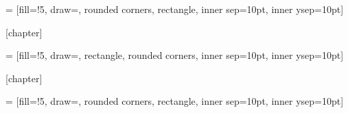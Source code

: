 
 = [fill=!5,
draw=,
rounded corners,
rectangle, inner sep=10pt, inner ysep=10pt]

\newcommand{\retenir}[2][]
{%
	\setlength{\netlength}{\textwidth}
	\addtolength{\netlength}{-20pt}
	
	\bigskip\noindent
	\begin{tikzpicture}
	\node[dboxstyle] (dbox)
	{\begin{minipage}{\netlength}
		\ifthenelse{\equal{#1}{\empty}}{\smallskip}{\medskip}
		#2
		\end{minipage}
	};
	\node[inner ysep=0pt] at (dbox.north west) [anchor=west, xshift=2mm,  fill=white, text=\defcolorfill, top color=white, bottom color=\defcolorfill!5, rounded corners]
	{\textbf{\large A retenir !}
		\ifthenelse{\equal{#1}{\empty}}{}{{\large(#1)}}
	};
	\end{tikzpicture}
}


[chapter]

 = [fill=\thmcolorfill!5,
draw=\thmcolorborder,
rectangle, rounded corners, inner sep=10pt, inner ysep=10pt]

\newcommand{\thm}[2][]
{\stepcounter{thmcounter}
	\setlength{\netlength}{\textwidth}
	\addtolength{\netlength}{-20pt}
	
	\medskip\noindent
	\begin{tikzpicture}
	\node[tboxstyle] (dbox)
	{\begin{minipage}{\netlength}
		\ifthenelse{\equal{#1}{\empty}}{\smallskip}{\medskip}
		#2
		\end{minipage}
	};
	\node at (dbox.north west) [xshift=2mm, anchor=west, fill=white, text=\thmcolorborder, top color=white, bottom color=\thmcolorfill!5, rounded corners]
	{\textbf{\large Théorème \arabic{thmcounter}}
		\ifthenelse{\equal{#1}{\empty}}{}{{\large(#1)}}
	};
	\end{tikzpicture}
}



[chapter]

 = [fill=\propcolorfill!5,
draw=\propcolorborder,
rounded corners,
rectangle, inner sep=10pt, inner ysep=10pt]

